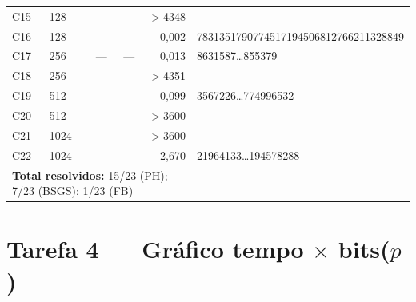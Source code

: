 \documentclass[conference, onecolumn]{IEEEtran}
\begin{document}
\begin{table}[H]
\begin{tabular}{@{}llrrrl@{}}
C15 & 128 & ---       & ---       & $>$4348  & --- \\
C16 & 128 & ---       & ---       & 0{,}002  & 7831351790774517194506812766211328849 \\
C17 & 256 & ---       & ---       & 0{,}013  & 8631587\ldots855379 \\
C18 & 256 & ---       & ---       & $>$4351  & --- \\
C19 & 512 & ---       & ---       & 0{,}099  & 3567226\ldots774996532 \\
C20 & 512 & ---       & ---       & $>$3600  & --- \\
C21 & 1024& ---       & ---       & $>$3600  & --- \\
C22 & 1024& ---       & ---       & 2{,}670  & 21964133\ldots194578288 \\
\midrule
\multicolumn{5}{l}{\textbf{Total resolvidos:} 15/23 (PH); 7/23 (BSGS); 1/23 (FB)} \\
\bottomrule
\end{tabular}
\end{table}

\section{Tarefa 4 — Gráfico tempo $\times$ bits($p$)}
\end{document}

